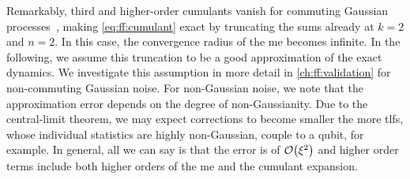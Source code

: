 Remarkably, third and higher-order cumulants vanish for commuting
Gaussian processes~\cite{Kubo1963,Szankowski2017}, making \cref{eq:ff:cumulant} exact by truncating the sums already at $k = 2$ and $n = 2$.
In this case, the convergence radius of the \gls{me} becomes infinite.
In the following, we assume this truncation to be a good approximation of the exact dynamics.
We investigate this assumption in more detail in \cref{ch:ff:validation} for non-commuting Gaussian noise.
For non-Gaussian noise, we note that the approximation error depends on the degree of non-Gaussianity.
Due to the central-limit theorem, we may expect corrections to become smaller the more \glspl{tlf}, whose individual statistics are highly non-Gaussian, couple to a qubit, for example.
In general, all we can say is that the error is of $\order{\xi^2}$ and higher order terms include both higher orders of the \gls{me} and the cumulant expansion.

